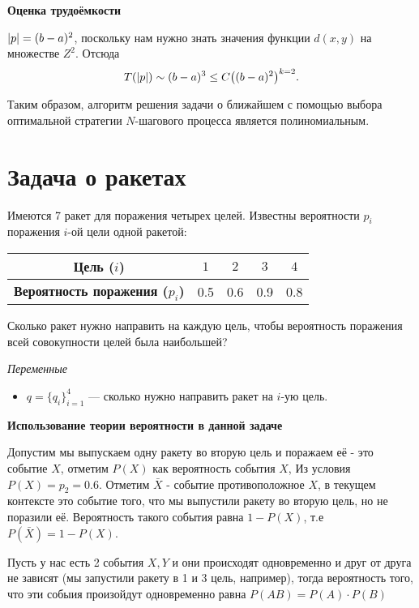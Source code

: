 \bigskip

\textbf{Оценка трудоёмкости}

$\abs{p} = (b - a)^2$, поскольку нам нужно знать значения функции $d(x, y)$ на множестве $Z^2$. Отсюда
\[
T(\abs{p}) \sim (b - a)^3 \le C \big((b-a)^2\big)^{k=2}.
\]

Таким образом, алгоритм решения задачи о ближайшем с помощью выбора оптимальной стратегии $N$-шагового процесса является полиномиальным.

\section{Задача о ракетах}

\problem[о ракетах]

Имеются 7 ракет для поражения четырех целей. Известны вероятности $p_i$ поражения $i$-ой цели одной ракетой: 

\begin{table}[h!]
	\centering
	\begin{tabular}{| c | c | c | c | c |} 
		\hline
		\textbf{Цель ($i$)}             & $1$ & $2$ & $3$ & $4$ \\\hline
		\textbf{Вероятность поражения ($p_i$)}              &0.5   & 0.6   & 0.9   & 0.8 \\\hline
	\end{tabular}
\end{table}

Сколько ракет нужно направить на каждую цель, чтобы вероятность поражения всей совокупности целей была наибольшей?

\bigskip

\textit{Переменные}

\begin{itemize}[nosep]	
	\item $q = \{q_i\}_{i=1}^4$ --- сколько нужно направить ракет на $i$-ую цель.
\end{itemize}

\bigskip

\textbf{Использование теории вероятности в данной задаче}

Допустим мы выпускаем одну ракету во вторую цель и поражаем её - это событие $X$, отметим $P(X)$ как вероятность события $X$, Из условия $P(X)=p_2=0.6$. Отметим $\bar{X}$ - событие противоположное $X$, в текущем контексте это событие того, что мы выпустили ракету во вторую цель, но не поразили её. Вероятность такого события равна $1 - P(X)$, т.е $P(\bar{X})=1-P(X)$.

Пусть у нас есть 2 события $X, Y$ и они происходят одновременно и друг от друга не зависят (мы запустили ракету в 1 и 3 цель, например), тогда вероятность того, что эти собыия произойдут одновременно равна $P(AB)=P(A) \cdot P(B)$

